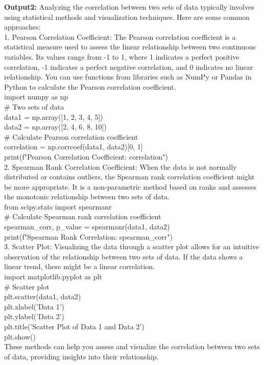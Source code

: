 \documentclass[UTF8]{ctexart} %
\begin{document}
\textbf{Output2:}
Analyzing the correlation between two sets of data typically involves using statistical methods and visualization techniques. Here are some common approaches:\\
1.	Pearson Correlation Coefficient: The Pearson correlation coefficient is a statistical measure used to assess the linear relationship between two continuous variables. Its values 
range from -1 to 1, where 1 indicates a perfect positive correlation, -1 indicates a perfect negative correlation, and 0 indicates no linear relationship. You can use functions from 
libraries such as NumPy or Pandas in Python to calculate the Pearson correlation coefficient.\\
import numpy as np\\
\# Two sets of data\\
data1 = np.array([1, 2, 3, 4, 5])\\
data2 = np.array([2, 4, 6, 8, 10])\\
\# Calculate Pearson correlation coefficient\\
correlation = np.corrcoef(data1, data2)[0, 1]\\
print(f"Pearson Correlation Coefficient: {correlation}")\\
2.	Spearman Rank Correlation Coefficient: When the data is not normally distributed or contains outliers, the Spearman rank correlation coefficient might be more appropriate. It is a 
non-parametric method based on ranks and assesses the monotonic relationship between two sets of data.\\
from scipy.stats import spearmanr\\
\# Calculate Spearman rank correlation coefficient\\
spearman\_corr, p\_value = spearmanr(data1, data2)\\
print(f"Spearman Rank Correlation: {spearman\_corr}")\\
3.	Scatter Plot: Visualizing the data through a scatter plot allows for an intuitive observation of the relationship between two sets of data. If the data shows a linear trend, there might 
be a linear correlation.\\
import matplotlib.pyplot as plt\\
\# Scatter plot\\
plt.scatter(data1, data2)\\
plt.xlabel('Data 1')\\
plt.ylabel('Data 2')\\
plt.title('Scatter Plot of Data 1 and Data 2')\\
plt.show()\\
These methods can help you assess and visualize the correlation between two sets of data, providing insights into their relationship.\\
\end{document}
